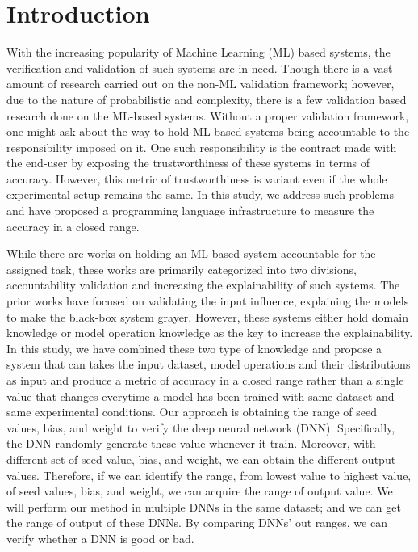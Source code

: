 
\section{Introduction}
With the increasing popularity of Machine Learning (ML) based systems, the verification and validation of such systems are in need. Though there is a vast amount of research carried out on the non-ML validation framework; however, due to the nature of probabilistic and complexity, there is a few validation based research done on the ML-based systems. Without a proper validation framework, one might ask about the way to hold ML-based systems being accountable to the responsibility imposed on it. One such responsibility is the contract made with the end-user by exposing the trustworthiness of these systems in terms of accuracy. However, this metric of trustworthiness is variant even if the whole experimental setup remains the same. In this study, we address such problems and have proposed a programming language infrastructure to measure the accuracy in a closed range.

While there are works on holding an ML-based system accountable for the assigned task, these works are primarily categorized into two divisions, accountability validation and increasing the explainability of such systems. The prior works have focused on validating the input influence, explaining the models to make the black-box system grayer. However, these systems either hold domain knowledge or model operation knowledge as the key to increase the explainability. In this study, we have combined these two type of knowledge and propose a system that can takes the input dataset, model operations and their distributions as input and produce a metric of accuracy in a closed range rather than a single value that changes everytime a model has been trained with same dataset and same experimental conditions. Our approach is obtaining the range of seed values, bias, and weight to verify the deep neural network (DNN). Specifically, the DNN randomly generate these value whenever it train. Moreover, with different set of seed value, bias, and weight, we can obtain the different output values. Therefore, if we can identify the range, from lowest value to highest value, of seed values, bias, and weight, we can acquire the range of output value. We will perform our method in multiple DNNs in the same dataset; and we can get the range of output of these DNNs. By comparing DNNs' out ranges, we can verify whether a DNN is good or bad.

